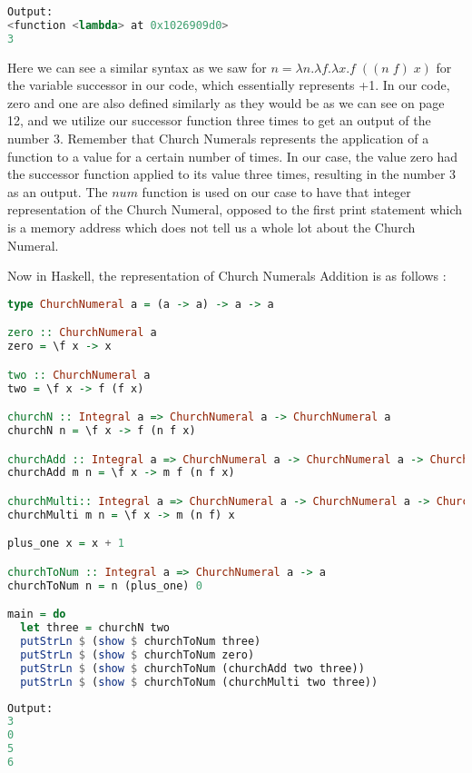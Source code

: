 \documentclass{article}
\begin{document}
\begin{lstlisting}[language=Python]
Output:
<function <lambda> at 0x1026909d0>
3
\end{lstlisting}
\noindent
Here we can see a similar syntax as we saw for $ n = \lambda n. \lambda f. \lambda x.f \; ((n \; f) \; x)$ for the variable successor in our code, which essentially represents +1. In our code, zero and one are also defined similarly as they would be as we can see on page 12, and we utilize our successor function three times to get an output of the number 3. Remember that Church Numerals represents the application of a function to a value for a certain number of times.  In our case, the value zero had the successor function applied to its value three times, resulting in the number 3 as an output. The $num$ function is used on our case to have that integer representation of the Church Numeral, opposed to the first print statement which is a memory address which does not tell us a whole lot about the Church Numeral. 

\medskip\noindent
Now in Haskell, the representation of Church Numerals Addition is as follows \cite{Church Numerals in Haskell}:

\begin{lstlisting}[language=haskell] 
type ChurchNumeral a = (a -> a) -> a -> a

zero :: ChurchNumeral a
zero = \f x -> x

two :: ChurchNumeral a
two = \f x -> f (f x)

churchN :: Integral a => ChurchNumeral a -> ChurchNumeral a
churchN n = \f x -> f (n f x)

churchAdd :: Integral a => ChurchNumeral a -> ChurchNumeral a -> ChurchNumeral a
churchAdd m n = \f x -> m f (n f x)

churchMulti:: Integral a => ChurchNumeral a -> ChurchNumeral a -> ChurchNumeral a
churchMulti m n = \f x -> m (n f) x

plus_one x = x + 1

churchToNum :: Integral a => ChurchNumeral a -> a
churchToNum n = n (plus_one) 0

main = do
  let three = churchN two
  putStrLn $ (show $ churchToNum three)
  putStrLn $ (show $ churchToNum zero)
  putStrLn $ (show $ churchToNum (churchAdd two three))
  putStrLn $ (show $ churchToNum (churchMulti two three))
\end{lstlisting}
\begin{lstlisting}[language=Python]
Output:
3
0
5
6
\end{lstlisting}
\end{document}
